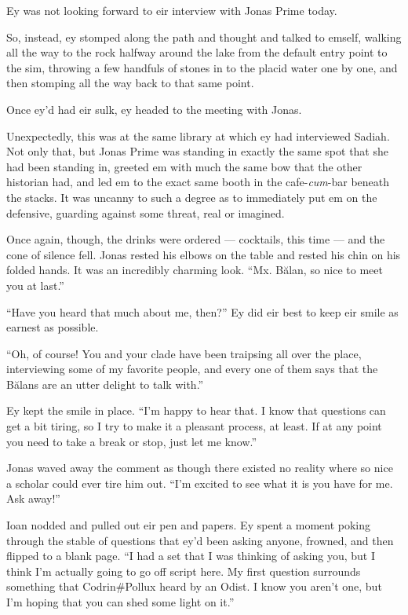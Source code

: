 Ey was not looking forward to eir interview with Jonas Prime today.

So, instead, ey stomped along the path and thought and talked to emself, walking all the way to the rock halfway around the lake from the default entry point to the sim, throwing a few handfuls of stones in to the placid water one by one, and then stomping all the way back to that same point.

Once ey'd had eir sulk, ey headed to the meeting with Jonas.

Unexpectedly, this was at the same library at which ey had interviewed Sadiah. Not only that, but Jonas Prime was standing in exactly the same spot that she had been standing in, greeted em with much the same bow that the other historian had, and led em to the exact same booth in the cafe-\emph{cum}-bar beneath the stacks. It was uncanny to such a degree as to immediately put em on the defensive, guarding against some threat, real or imagined.

Once again, though, the drinks were ordered — cocktails, this time — and the cone of silence fell. Jonas rested his elbows on the table and rested his chin on his folded hands. It was an incredibly charming look. ``Mx. Bălan, so nice to meet you at last.''

``Have you heard that much about me, then?'' Ey did eir best to keep eir smile as earnest as possible.

``Oh, of course! You and your clade have been traipsing all over the place, interviewing some of my favorite people, and every one of them says that the Bălans are an utter delight to talk with.''

Ey kept the smile in place. ``I'm happy to hear that. I know that questions can get a bit tiring, so I try to make it a pleasant process, at least. If at any point you need to take a break or stop, just let me know.''

Jonas waved away the comment as though there existed no reality where so nice a scholar could ever tire him out. ``I'm excited to see what it is you have for me. Ask away!''

Ioan nodded and pulled out eir pen and papers. Ey spent a moment poking through the stable of questions that ey'd been asking anyone, frowned, and then flipped to a blank page. ``I had a set that I was thinking of asking you, but I think I'm actually going to go off script here. My first question surrounds something that Codrin\#Pollux heard by an Odist. I know you aren't one, but I'm hoping that you can shed some light on it.''

